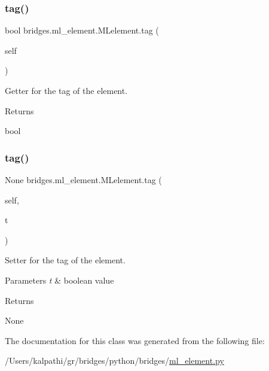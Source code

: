 \subsubsection{\texorpdfstring{tag()}{tag()}\hspace{0.1cm}{\footnotesize\ttfamily [1/2]}}
{\footnotesize\ttfamily  bool bridges.\+ml\+\_\+element.\+M\+Lelement.\+tag (\begin{DoxyParamCaption}\item[{}]{self }\end{DoxyParamCaption})}



Getter for the tag of the element. 

\begin{DoxyReturn}{Returns}


bool 
\end{DoxyReturn}
\mbox{\label{classbridges_1_1ml__element_1_1_m_lelement_aa3357a7e9244614e04ac9f9da499b567}} 
\subsubsection{\texorpdfstring{tag()}{tag()}\hspace{0.1cm}{\footnotesize\ttfamily [2/2]}}
{\footnotesize\ttfamily  None bridges.\+ml\+\_\+element.\+M\+Lelement.\+tag (\begin{DoxyParamCaption}\item[{}]{self,  }\item[{}]{t }\end{DoxyParamCaption})}



Setter for the tag of the element. 


\begin{DoxyParams}{Parameters}
{\em t} & boolean value \\
\hline
\end{DoxyParams}
\begin{DoxyReturn}{Returns}


None 
\end{DoxyReturn}


The documentation for this class was generated from the following file\+:\begin{DoxyCompactItemize}
\item 
/\+Users/kalpathi/gr/bridges/python/bridges/\mbox{\hyperlink{ml__element_8py}{ml\+\_\+element.\+py}}\end{DoxyCompactItemize}
